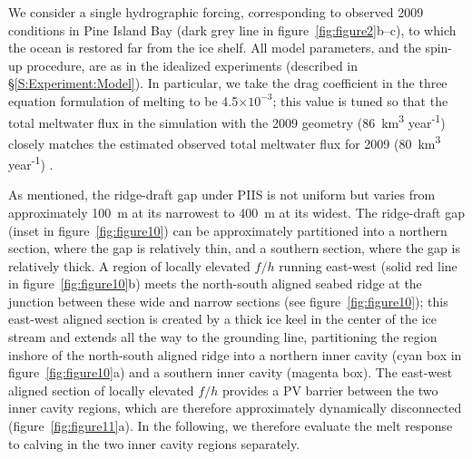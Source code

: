 \documentclass[draft]{agujournal2019}
\begin{document}
We consider a single hydrographic forcing, corresponding to observed 2009 conditions in Pine Island Bay (dark grey line in figure~\ref{fig:figure2}b--c), to which the ocean is restored far from the ice shelf. All model parameters, and the spin-up procedure, are as in the idealized experiments (described in \S\ref{S:Experiment:Model}). In particular, we take the drag coefficient in the three equation formulation of melting to be 4.5$\times10^{-3}$; this value is tuned so that the total meltwater flux in the simulation with the 2009 geometry (86~km\textsuperscript{3} year\textsuperscript{-1}) closely matches the estimated observed total meltwater flux for 2009 (80~km\textsuperscript{3} year\textsuperscript{-1}) \cite{Dutrieux2014Science}.

As mentioned, the ridge-draft gap under PIIS is not uniform but varies from approximately 100~m at its narrowest to 400~m at its widest.  The ridge-draft gap (inset in figure~\ref{fig:figure10}) can be approximately partitioned into a northern section, where the gap is relatively thin, and a southern section, where the gap is relatively thick. A region of locally elevated $f/h$ running east-west (solid red line in figure~\ref{fig:figure10}b) meets the north-south aligned seabed ridge at the junction between these wide and narrow sections (see figure~\ref{fig:figure10}); this east-west aligned section is created by a thick ice keel in the center of the ice stream and extends all the way to the grounding line, partitioning the region inshore of the north-south aligned ridge into a northern inner cavity (cyan box in figure~\ref{fig:figure10}a) and a southern inner cavity (magenta box). The east-west aligned section of locally elevated $f/h$  provides a PV barrier between the two inner cavity regions, which are therefore approximately dynamically disconnected (figure~\ref{fig:figure11}a). In the following, we therefore evaluate the melt response to calving in the two inner cavity regions separately.
\end{document}
